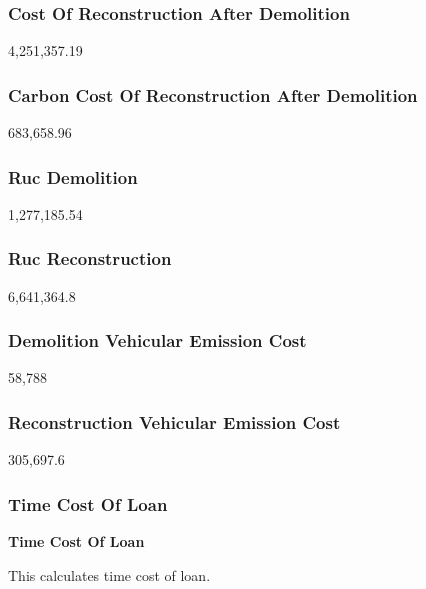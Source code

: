 \documentclass{article}
\begin{document}
\subsubsection{Cost Of Reconstruction After Demolition}
4,251,357.19
\subsubsection{Carbon Cost Of Reconstruction After Demolition}
683,658.96
\subsubsection{Ruc Demolition}
1,277,185.54
\subsubsection{Ruc Reconstruction}
6,641,364.8
\subsubsection{Demolition Vehicular Emission Cost}
58,788
\subsubsection{Reconstruction Vehicular Emission Cost}
305,697.6
\subsubsection{Time Cost Of Loan}
\vspace{0.4em}
\textbf{Time Cost Of Loan}\par\vspace{-0.35em}
This calculates time cost of loan.
\end{document}
